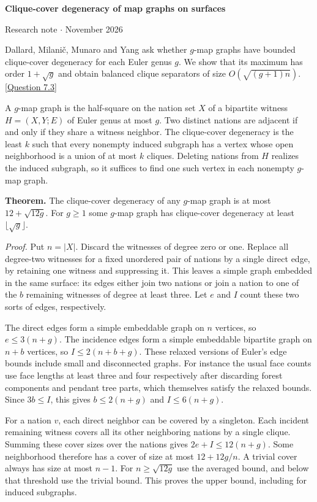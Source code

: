 \documentclass[11pt]{article}
\begin{document}
\begin{center}{\Large\bfseries Clique-cover degeneracy of map graphs on surfaces}\par
\small Research note \enspace$\cdot$ November 2026\end{center}

Dallard, Milani\v c, Munaro and Yang ask whether $g$-map graphs have bounded clique-cover degeneracy for each Euler genus $g$. We show that its maximum has order $1+\sqrt g$ and obtain balanced clique separators of size $O(\sqrt{(g+1)n})$. [\href{https://arxiv.org/abs/2506.12424}{Question 7.3}]

A $g$-map graph is the half-square on the nation set $X$ of a bipartite witness $H=(X,Y;E)$ of Euler genus at most $g$. Two distinct nations are adjacent if and only if they share a witness neighbor. The clique-cover degeneracy is the least $k$ such that every nonempty induced subgraph has a vertex whose open neighborhood is a union of at most $k$ cliques. Deleting nations from $H$ realizes the induced subgraph, so it suffices to find one such vertex in each nonempty $g$-map graph.

\textbf{Theorem.} The clique-cover degeneracy of any $g$-map graph is at most $12+\sqrt{12g}$. For $g\ge1$ some $g$-map graph has clique-cover degeneracy at least $\lfloor\sqrt g\rfloor$.

\textit{Proof.} Put $n=|X|$. Discard the witnesses of degree zero or one. Replace all degree-two witnesses for a fixed unordered pair of nations by a single direct edge, by retaining one witness and suppressing it. This leaves a simple graph embedded in the same surface: its edges either join two nations or join a nation to one of the $b$ remaining witnesses of degree at least three. Let $e$ and $I$ count these two sorts of edges, respectively.

The direct edges form a simple embeddable graph on $n$ vertices, so $e\le3(n+g)$. The incidence edges form a simple embeddable bipartite graph on $n+b$ vertices, so $I\le2(n+b+g)$. These relaxed versions of Euler's edge bounds include small and disconnected graphs. For instance the usual face counts use face lengths at least three and four respectively after discarding forest components and pendant tree parts, which themselves satisfy the relaxed bounds. Since $3b\le I$, this gives $b\le2(n+g)$ and $I\le6(n+g)$.

For a nation $v$, each direct neighbor can be covered by a singleton. Each incident remaining witness covers all its other neighboring nations by a single clique. Summing these cover sizes over the nations gives $2e+I\le12(n+g)$. Some neighborhood therefore has a cover of size at most $12+12g/n$. A trivial cover always has size at most $n-1$. For $n\ge\sqrt{12g}$ use the averaged bound, and below that threshold use the trivial bound. This proves the upper bound, including for induced subgraphs.
\end{document}
